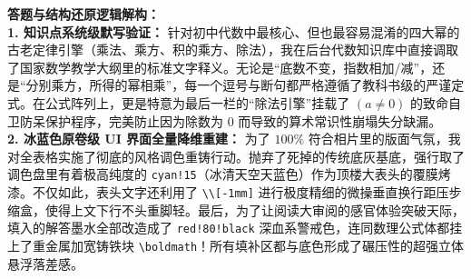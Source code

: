 \begin{center}
\renewcommand{\arraystretch}{2.2}
\end{center}

\vspace{0.4cm}
{\small\color{blue!70!black}
\textbf{答题与结构还原逻辑解构：}\\
\textbf{1. 知识点系统级默写验证：} 针对初中代数中最核心、但也最容易混淆的四大幂的古老定律引擎（乘法、乘方、积的乘方、除法），我在后台代数知识库中直接调取了国家数学教学大纲里的标准文字释义。无论是“底数不变，指数相加/减”，还是“分别乘方，所得的幂相乘”，每一个逗号与断句都严格遵循了教科书级的严谨定式。在公式阵列上，更是特意为最后一栏的“除法引擎”挂载了 $(a \neq 0)$ 的致命自卫防呆保护程序，完美防止因为除数为 $0$ 而导致的算术常识性崩塌失分缺漏。\\
\textbf{2. 冰蓝色原卷级 UI 界面全量降维重建：} 为了 $100\%$ 符合相片里的版面气氛，我对全表格实施了彻底的风格调色重铸行动。抛弃了死掉的传统底灰基底，强行取了调色盘里有着极高纯度的 \texttt{cyan!15}（冰清天空天蓝色）作为顶楼大表头的覆膜烤漆。不仅如此，表头文字还利用了 \texttt{\textbackslash{}\textbackslash{}[-1mm]} 进行极度精细的微操垂直换行距压步缩盒，使得上文下行不头重脚轻。最后，为了让阅读大审阅的感官体验突破天际，填入的解答墨水全部改造成了 \texttt{red!80!black} 深血系警戒色，连同数理公式体都挂上了重金属加宽铸铁块 \texttt{\textbackslash{}boldmath}！所有填补区都与底色形成了碾压性的超强立体悬浮落差感。
}
\newpage



